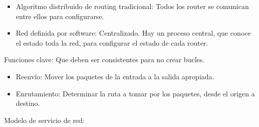 \documentclass[12pt, twoside, openright]{report} %
\begin{document}
\begin{itemize}
\begin{itemize}
		            \begin{itemize}
			            \item Algoritmo distribuido de routing tradicional: Todos los router
			                  se comunican entre ellos para configurarse.
			            \item Red definida por software: Centralizado. Hay un proceso
			                  central, que conoce el estado toda la red, para configurar el
			                  estado de cada router.
		            \end{itemize}
	      \end{itemize}
\end{itemize}

Funciones clave: Que deben ser consistentes para no crear bucles.

\begin{itemize}
	\item Reenvío: Mover los paquetes de la entrada a la salida apropiada.
	\item Enrutamiento: Determinar la ruta a tomar por los paquetes, desde
	      el origen a destino.
\end{itemize}

Modelo de servicio de red:
\end{document}

